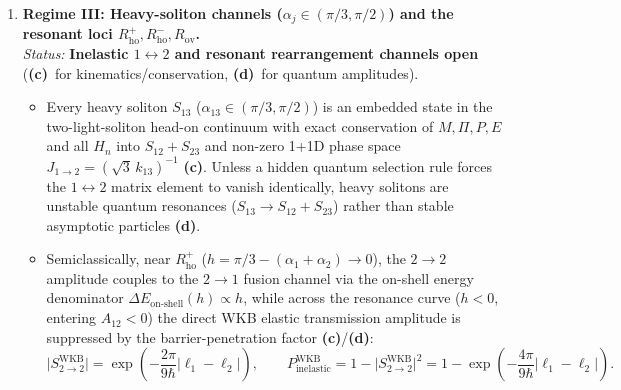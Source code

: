 \documentclass[11pt,a4paper]{article}
\newcommand{\Lc}{\textsf{\textbf{(c)}}\xspace}
\newcommand{\Ld}{\textsf{\textbf{(d)}}\xspace}
\newcommand{\hb}{\hbar}
\theoremstyle{remark}
\begin{document}
\begin{enumerate}
\item \textbf{Regime III: Heavy-soliton channels ($\alpha_j \in (\pi/3,\pi/2)$) and the resonant loci $R_{\mathrm{ho}}^+,R_{\mathrm{ho}}^-,R_{\mathrm{ov}}$.}\\
\emph{Status:} \textbf{Inelastic $1\leftrightarrow 2$ and resonant rearrangement channels open} (\Lc\ for kinematics/conservation, \Ld\ for quantum amplitudes).
\begin{itemize}
\item Every heavy soliton $S_{13}$ ($\alpha_{13}\in(\pi/3,\pi/2)$) is an embedded
state in the two-light-soliton head-on continuum with exact conservation of
$M,\Pi,P,E$ and all $H_n$ into $S_{12}+S_{23}$ and non-zero 1+1D phase space
$J_{1\to 2}=(\sqrt{3}\,k_{13})^{-1}$ \Lc. Unless a hidden quantum selection rule
forces the $1\leftrightarrow 2$ matrix element to vanish identically, heavy
solitons are unstable quantum resonances ($S_{13}\to S_{12}+S_{23}$) rather than
stable asymptotic particles \Ld.
\item Semiclassically, near $R_{\mathrm{ho}}^+$ ($h = \pi/3 - (\alpha_1+\alpha_2) \to 0$),
the $2\to 2$ amplitude couples to the $2\to 1$ fusion channel via the on-shell
energy denominator $\Delta E_{\mathrm{on\text{-}shell}}(h) \propto h$, while
across the resonance curve ($h < 0$, entering $A_{12} < 0$) the direct WKB
elastic transmission amplitude is suppressed by the barrier-penetration factor \Lc/\Ld:
\begin{equation}\label{eq:inelastic_amp}
  \big|S_{2\to 2}^{\mathrm{WKB}}\big| = \exp\!\left(-\frac{2\pi}{9\hb}|\ell_1-\ell_2|\right), \qquad
  P_{\mathrm{inelastic}}^{\mathrm{WKB}} = 1 - \big|S_{2\to 2}^{\mathrm{WKB}}\big|^2
  = 1 - \exp\!\left(-\frac{4\pi}{9\hb}|\ell_1-\ell_2|\right).
\end{equation}
\end{itemize}


\end{enumerate}
\end{document}
